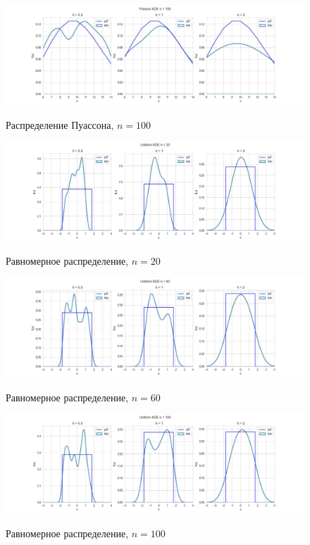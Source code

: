 \begin{figure}[H]
	{\includegraphics[scale=0.45]{task_4/resource/Poisson KDE100.jpg}}
		\caption{Распределение Пуассона, $n=100$} 
		\label{fig:normal}
	\end{figure}
	
\begin{figure}[H]
	{\includegraphics[scale=0.45]{task_4/resource/Uniform KDE20.jpg}}
		\caption{Равномерное распределение, $n=20$} 
		\label{fig:normal}
	\end{figure}
	
\begin{figure}[H]
	{\includegraphics[scale=0.45]{task_4/resource/Uniform KDE60.jpg}}
		\caption{Равномерное распределение, $n=60$} 
		\label{fig:normal}
	\end{figure}

\begin{figure}[H]
	{\includegraphics[scale=0.45]{task_4/resource/Uniform KDE100.jpg}}
		\caption{Равномерное распределение, $n=100$} 
		\label{fig:normal}
	\end{figure}